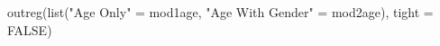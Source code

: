 \begin{Schunk}
\begin{Sinput}
 outreg(list("Age Only" = mod1age, "Age With Gender" = mod2age), tight = FALSE)
\end{Sinput}
\end{Schunk}
